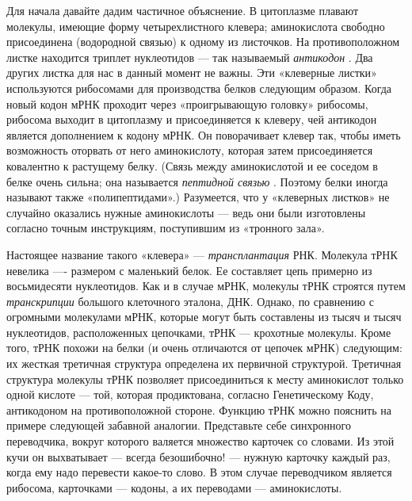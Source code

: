 Для начала давайте дадим частичное объяснение. В цитоплазме плавают молекулы, имеющие форму четырехлистного клевера; аминокислота свободно присоединена (водородной связью) к одному из листочков. На противоположном листке находится триплет нуклеотидов --- так называемый \emph{антикодон} . Два других листка для нас в данный момент не важны. Эти «клеверные листки» используются рибосомами для производства белков следующим образом. Когда новый кодон мРНК проходит через «проигрывающую головку» рибосомы, рибосома выходит в цитоплазму и присоединяется к клеверу, чей антикодон является дополнением к кодону мРНК. Он поворачивает клевер так, чтобы иметь возможность оторвать от него аминокислоту, которая затем присоединяется ковалентно к растущему белку. (Связь между аминокислотой и ее соседом в белке очень сильна; она называется \emph{пептидной связью} . Поэтому белки иногда называют также «полипептидами».) Разумеется, что у «клеверных листков» не случайно оказались нужные аминокислоты --- ведь они были изготовлены согласно точным инструкциям, поступившим из «тронного зала».

Настоящее название такого «клевера» --- \emph{трансплантация} РНК. Молекула тРНК невелика ---- размером с маленький белок. Ее составляет цепь примерно из восьмидесяти нуклеотидов. Как и в случае мРНК, молекулы тРНК строятся путем \emph{транскрипции} большого клеточного эталона, ДНК. Однако, по сравнению с огромными молекулами мРНК, которые могут быть составлены из тысяч и тысяч нуклеотидов, расположенных цепочками, тРНК --- крохотные молекулы. Кроме того, тРНК похожи на белки (и очень отличаются от цепочек мРНК) следующим: их жесткая третичная структура определена их первичной структурой. Третичная структура молекулы тРНК позволяет присоединиться к месту аминокислот только одной кислоте --- той, которая продиктована, согласно Генетическому Коду, антикодоном на противоположной стороне. Функцию тРНК можно пояснить на примере следующей забавной аналогии. Представьте себе синхронного переводчика, вокруг которого валяется множество карточек со словами. Из этой кучи он выхватывает --- всегда безошибочно! --- нужную карточку каждый раз, когда ему надо перевести какое-то слово. В этом случае переводчиком является рибосома, карточками --- кодоны, а их переводами --- аминокислоты.

